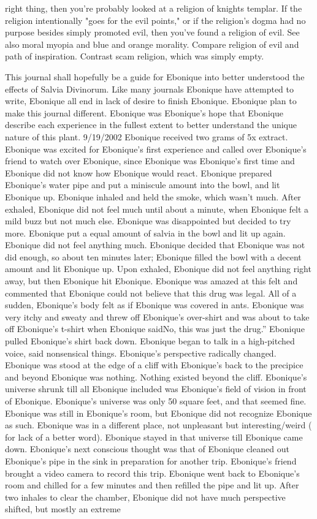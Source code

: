 \documentclass[12pt]{book}
\begin{document}
right thing, then you're probably looked at a religion of knights templar. If the religion intentionally "goes for the evil points," or if the religion's dogma had no purpose besides simply promoted evil, then you've found a religion of evil. See also moral myopia and blue and orange morality. Compare religion of evil and path of inspiration. Contrast scam religion, which was simply empty.



This journal shall hopefully be a guide for Ebonique into better understood the effects of Salvia Divinorum. Like many journals Ebonique have attempted to write, Ebonique all end in lack of desire to finish Ebonique. Ebonique plan to make this journal different. Ebonique was Ebonique's hope that Ebonique describe each experience in the fullest extent to better understand the unique nature of this plant. 9/19/2002 Ebonique received two grams of 5x extract. Ebonique was excited for Ebonique's first experience and called over Ebonique's friend to watch over Ebonique, since Ebonique was Ebonique's first time and Ebonique did not know how Ebonique would react. Ebonique prepared Ebonique's water pipe and put a miniscule amount into the bowl, and lit Ebonique up. Ebonique inhaled and held the smoke, which wasn't much. After exhaled, Ebonique did not feel much until about a minute, when Ebonique felt a mild buzz but not much else. Ebonique was disappointed but decided to try more. Ebonique put a equal amount of salvia in the bowl and lit up again. Ebonique did not feel anything much. Ebonique decided that Ebonique was not did enough, so about ten minutes later; Ebonique filled the bowl with a decent amount and lit Ebonique up. Upon exhaled, Ebonique did not feel anything right away, but then Ebonique hit Ebonique. Ebonique was amazed at this felt and commented that Ebonique could not believe that this drug was legal. All of a sudden, Ebonique's body felt as if Ebonique was covered in ants. Ebonique was very itchy and sweaty and threw off Ebonique's over-shirt and was about to take off Ebonique's t-shirt when Ebonique saidNo, this was just the drug.'' Ebonique pulled Ebonique's shirt back down. Ebonique began to talk in a high-pitched voice, said nonsensical things. Ebonique's perspective radically changed. Ebonique was stood at the edge of a cliff with Ebonique's back to the precipice and beyond Ebonique was nothing. Nothing existed beyond the cliff. Ebonique's universe shrunk till all Ebonique included was Ebonique's field of vision in front of Ebonique. Ebonique's universe was only 50 square feet, and that seemed fine. Ebonique was still in Ebonique's room, but Ebonique did not recognize Ebonique as such. Ebonique was in a different place, not unpleasant but interesting/weird ( for lack of a better word). Ebonique stayed in that universe till Ebonique came down. Ebonique's next conscious thought was that of Ebonique cleaned out Ebonique's pipe in the sink in preparation for another trip. Ebonique's friend brought a video camera to record this trip. Ebonique went back to Ebonique's room and chilled for a few minutes and then refilled the pipe and lit up. After two inhales to clear the chamber, Ebonique did not have much perspective shifted, but mostly an extreme 
\end{document}
